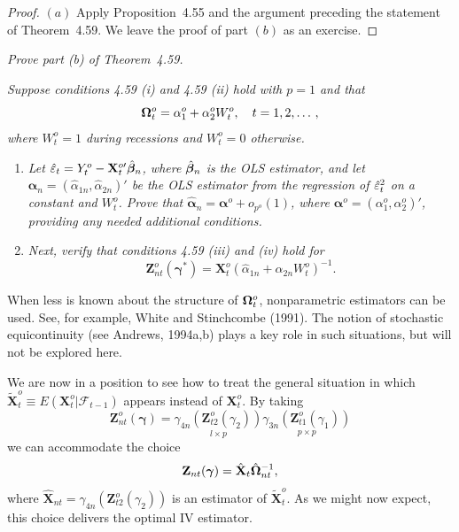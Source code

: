 \begin{proof}
$(a)$ Apply Proposition~4.55 and the argument preceding the statement of Theorem~4.59. We leave the proof of part $(b)$ as an exercise.
\end{proof}

\begin{exercises}
\item\label{ex:4.60} \textit{Prove part (b) of Theorem~4.59.}

\item\label{ex:4.61} \textit{Suppose conditions 4.59 (i) and 4.59 (ii) hold with $p = 1$ and that}
\[
\boldsymbol{\Omega}_t^o = \alpha_1^o + \alpha_2^oW_t^o, \quad t = 1, 2, \ldots\,,
\]
\textit{where $W_t^o = 1$ during recessions and $W_t^o = 0$ otherwise.}
\begin{enumerate}[label=(\roman*)]
\item \textit{Let $\hat{\varepsilon}_t = Y_t^o - \mathbf{X}_t^{o\prime}\hat{\boldsymbol{\beta}}_n$, where $\hat{\boldsymbol{\beta}}_n$ is the OLS estimator, and let $\hat{\boldsymbol{\alpha}}_n = (\hat{\alpha}_{1n}, \hat{\alpha}_{2n})'$ be the OLS estimator from the regression of $\hat{\varepsilon}_t^2$ on a constant and $W_t^o$. Prove that $\hat{\boldsymbol{\alpha}}_n = \boldsymbol{\alpha}^o + o_{p^o}(1)$, where $\boldsymbol{\alpha}^o = (\alpha_1^o, \alpha_2^o)'$, providing any needed additional conditions.}
\item \textit{Next, verify that conditions 4.59 (iii) and (iv) hold for}
\[
\mathbf{Z}_{nt}^o(\boldsymbol{\gamma}^*) = \mathbf{X}_t^o(\hat{\alpha}_{1n} + \hat{\alpha}_{2n}W_t^o)^{-1}.
\]
\end{enumerate}
\end{exercises}

When less is known about the structure of $\boldsymbol{\Omega}_t^o$, nonparametric estimators
can be used. See, for example, White and Stinchcombe (1991). The notion
of stochastic equicontinuity (see Andrews, 1994a,b) plays a key role in such
situations, but will not be explored here.

We are now in a position to see how to treat the general situation in
which $\tilde{\mathbf{X}}_t^o \equiv E(\mathbf{X}_t^o|\mathcal{F}_{t-1})$ appears instead of $\mathbf{X}_t^o$. By taking
\[
\mathbf{Z}_{nt}^o(\boldsymbol{\gamma}) = \underset{l \times p}{\gamma_{4n}(\mathbf{Z}_{t2}^o(\gamma_2))}\underset{p \times p}{\gamma_{3n}(\mathbf{Z}_{t1}^o(\gamma_1))}
\]
we can accommodate the choice
\[
\mathbf{Z}_{nt}(\boldsymbol{\gamma}) = \hat{\mathbf{X}}_t\hat{\boldsymbol{\Omega}}_{nt}^{-1},
\]
where $\hat{\mathbf{X}}_{nt} = \gamma_{4n}(\mathbf{Z}_{t2}^o(\gamma_2))$ is an estimator of $\tilde{\mathbf{X}}_t^o$. As we might
now expect, this choice delivers the optimal IV estimator.

